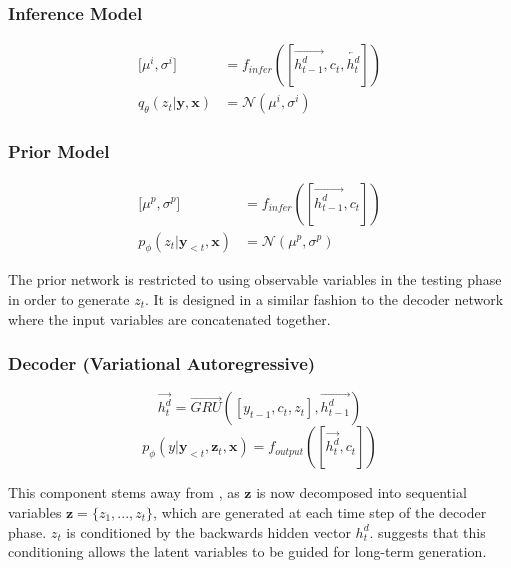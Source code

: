 \documentclass[12pt,twoside]{report}
\begin{document}
\subsubsection{Inference Model}


\begin{equation}
\label{eq:t}
\begin{aligned}
\lbrack \mu^i, \sigma^i \rbrack &=
f_{infer}([\overrightarrow{h^d_{t-1}}, c_t, \overleftarrow{h^d_t}])
\\
q_{\theta}(z_t|\boldsymbol{y}, \boldsymbol{x}) &= \mathcal{N}(\mu^i, \sigma^i)
\end{aligned}
\end{equation}

\subsubsection{Prior Model}

\begin{equation}
\label{eq:t}
\begin{aligned}
\lbrack \mu^p, \sigma^p \rbrack &=
f_{infer}([\overrightarrow{h^d_{t-1}}, c_t])
\\
p_{\phi}(z_t|\boldsymbol{y}_{<t}, \boldsymbol{x}) &= \mathcal{N}(\mu^p, \sigma^p)
\end{aligned}
\end{equation}

The prior network is restricted to using observable variables in the testing phase in order to generate $z_t$. It is designed in a similar fashion to the decoder network where the input variables are concatenated together.

\subsubsection{Decoder (Variational Autoregressive)}

\begin{equation}
	\overrightarrow{h^d_t} = \overrightarrow{GRU}([y_{t-1},c_t,z_t], \overrightarrow{h^d_{t-1}})
\end{equation}
\begin{equation}
	p_\phi(y|\boldsymbol{y}_{<t},\boldsymbol{z}_t, \boldsymbol{x}) = f_{output}([\overrightarrow{h^d_t}, c_t])
\end{equation}

This component stems away from \cite{zhao_learning_2017}, as $\boldsymbol{z}$ is now decomposed into sequential variables $\boldsymbol{z} = \{z_1,...,z_t\}$, which are generated at each time step of the decoder phase. $z_t$ is conditioned by the backwards hidden vector $h^d_{t}$. \cite{du_variational_2018} suggests that this conditioning allows the latent variables to be guided for long-term generation.
\end{document}
